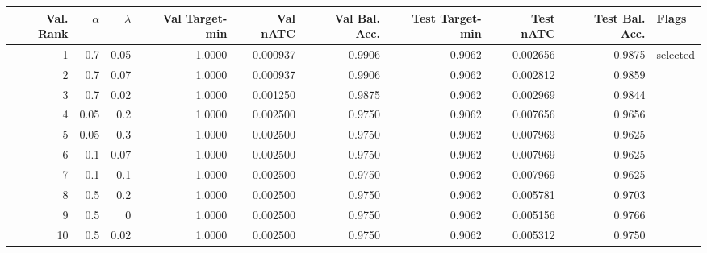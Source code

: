 \begin{tabular}{rrrrrrrrrl}
\toprule
Val. Rank & $\alpha$ & $\lambda$ & Val Target-min & Val nATC & Val Bal. Acc. & Test Target-min & Test nATC & Test Bal. Acc. & Flags \\
\midrule
1 & 0.7 & 0.05 & 1.0000 & 0.000937 & 0.9906 & 0.9062 & 0.002656 & 0.9875 & selected \\
2 & 0.7 & 0.07 & 1.0000 & 0.000937 & 0.9906 & 0.9062 & 0.002812 & 0.9859 &  \\
3 & 0.7 & 0.02 & 1.0000 & 0.001250 & 0.9875 & 0.9062 & 0.002969 & 0.9844 &  \\
4 & 0.05 & 0.2 & 1.0000 & 0.002500 & 0.9750 & 0.9062 & 0.007656 & 0.9656 &  \\
5 & 0.05 & 0.3 & 1.0000 & 0.002500 & 0.9750 & 0.9062 & 0.007969 & 0.9625 &  \\
6 & 0.1 & 0.07 & 1.0000 & 0.002500 & 0.9750 & 0.9062 & 0.007969 & 0.9625 &  \\
7 & 0.1 & 0.1 & 1.0000 & 0.002500 & 0.9750 & 0.9062 & 0.007969 & 0.9625 &  \\
8 & 0.5 & 0.2 & 1.0000 & 0.002500 & 0.9750 & 0.9062 & 0.005781 & 0.9703 &  \\
9 & 0.5 & 0 & 1.0000 & 0.002500 & 0.9750 & 0.9062 & 0.005156 & 0.9766 &  \\
10 & 0.5 & 0.02 & 1.0000 & 0.002500 & 0.9750 & 0.9062 & 0.005312 & 0.9750 &  \\
\bottomrule
\end{tabular}
